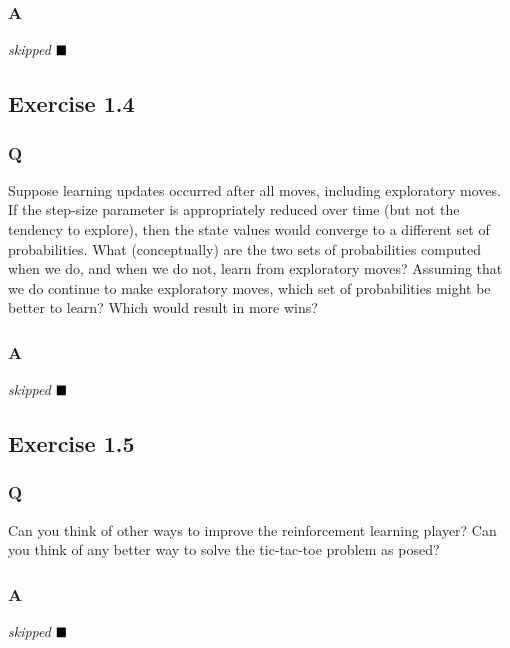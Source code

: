 \subsubsection*{A}
\textit{skipped}
$
\hfill \blacksquare
$

\subsection{Exercise 1.4}
\subsubsection*{Q}
Suppose learning updates occurred after all moves, including exploratory moves. If the step-size parameter is appropriately reduced over time (but not the tendency to explore), then the state values would converge to a different set of probabilities. What (conceptually) are the two sets of probabilities computed when we do, and when we do not, learn from exploratory moves? Assuming that we do continue to make exploratory moves, which set of probabilities might be better to learn? Which would result in more wins?
\subsubsection*{A}
\textit{skipped}
$
\hfill \blacksquare
$

\subsection{Exercise 1.5}
\subsubsection*{Q}
Can you think of other ways to improve the reinforcement learning player? Can you think of any better way to solve the tic-tac-toe problem as posed?
\subsubsection*{A}
\textit{skipped}
$
\hfill \blacksquare
$